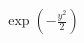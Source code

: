 \documentclass[preview]{standalone}
\begin{document}
\begin{align*}
\exp (-\frac{y^2}{2})
\end{align*}
\end{document}
